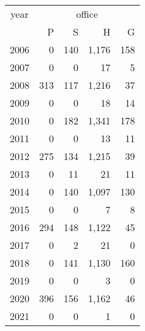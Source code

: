 \footnotesize\begin{tabular}[t]{lrrrr}
\toprule
\multicolumn{1}{c}{year} & \multicolumn{4}{c}{office} \\
\cmidrule(l{3pt}r{3pt}){1-1} \cmidrule(l{3pt}r{3pt}){2-5}
  & P & S & H & G\\
\midrule
2006 & 0 & 140 & 1,176 & 158\\
2007 & 0 & 0 & 17 & 5\\
2008 & 313 & 117 & 1,216 & 37\\
2009 & 0 & 0 & 18 & 14\\
2010 & 0 & 182 & 1,341 & 178\\
2011 & 0 & 0 & 13 & 11\\
2012 & 275 & 134 & 1,215 & 39\\
2013 & 0 & 11 & 21 & 11\\
2014 & 0 & 140 & 1,097 & 130\\
2015 & 0 & 0 & 7 & 8\\
2016 & 294 & 148 & 1,122 & 45\\
2017 & 0 & 2 & 21 & 0\\
2018 & 0 & 141 & 1,130 & 160\\
2019 & 0 & 0 & 3 & 0\\
2020 & 396 & 156 & 1,162 & 46\\
2021 & 0 & 0 & 1 & 0\\
\bottomrule
\end{tabular}
